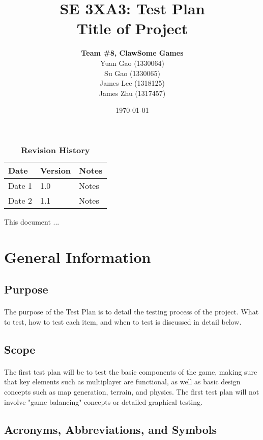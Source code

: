 \documentclass[12pt, titlepage]{article}
\title{SE 3XA3: Test Plan\\Title of Project}
\author{\textbf{Team \#8, ClawSome Games}
		\\ Yuan Gao (1330064)
		\\ Su Gao (1330065)
		\\ James Lee (1318125)
		\\ James Zhu (1317457) 
}
\date{\today}
\begin{document}
\maketitle
{}
\tableofcontents
\listoftables
\listoffigures
\begin{table}[bp]
\caption{\bf Revision History}
\begin{tabularx}{\textwidth}{p{3cm}p{2cm}X}
\toprule {\bf Date} & {\bf Version} & {\bf Notes}\\
\midrule
Date 1 & 1.0 & Notes\\
Date 2 & 1.1 & Notes\\
\bottomrule
\end{tabularx}
\end{table}
\newpage
{}
This document ...
\section{General Information}
\subsection{Purpose}
\paragraph{}The purpose of the Test Plan is to detail the testing process of the project. What to test, how to test each item, and when to test is discussed in detail below. 
\subsection{Scope}
\paragraph{}The first test plan will be to test the basic components of the game, making sure that key elements such as multiplayer are functional, as well as basic design concepts such as map generation, terrain, and physics. The first test plan will not involve "game balancing" concepts or detailed graphical testing. 
\subsection{Acronyms, Abbreviations, and Symbols}
	
\end{document}
